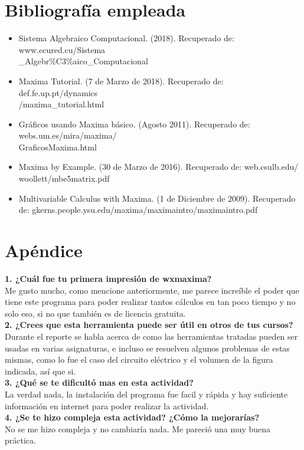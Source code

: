 \documentclass[12pt]{article}
\begin{document}
\section{Bibliografía empleada}
\begin{itemize}
    \item Sistema Algebraico Computacional. (2018). Recuperado de: www.ecured.cu/Sistema \\ \_Algebr\%C3\%aico\_Computacional
    \item Maxima Tutorial. (7 de Marzo de 2018). Recuperado de: def.fe.up.pt/dynamics \\/maxima\_tutorial.html
    \item Gráficos usando Maxima básico. (Agosto 2011). Recuperado de: webs.um.es/mira/maxima/ \\ GraficosMaxima.html
    \item Maxima by Example. (30 de Marzo de 2016). Recuperado de: web.csulb.edu/\~\\woollett/mbe5matrix.pdf
    \item Multivariable Calculus with Maxima. (1 de Diciembre de 2009). Recuperado de: gkerns.people.ysu.edu/maxima/maximaintro/maximaintro.pdf
\end{itemize}

\section{Apéndice}
\noindent\textbf {1. ¿Cuál fue tu primera impresión de wxmaxima?} \\

Me gusto mucho, como mencione anteriormente, me parece increíble el poder que tiene este programa para poder realizar tantos cálculos en tan poco tiempo y no solo eso, si no que también es de licencia gratuita. \\

\noindent\textbf {2. ¿Crees que esta herramienta puede ser útil en otros de tus cursos?} \\

Durante el reporte se habla acerca de como las herramientas tratadas pueden ser usadas en varias asignaturas, e incluso se resuelven algunos problemas de estas mismas, como lo fue el caso del circuito eléctrico y el volumen de la figura indicada, así que si. \\

\noindent\textbf {3. ¿Qué se te dificultó mas en esta actividad?} \\

La verdad nada, la instalación del programa fue facil y rápida y hay suficiente información en internet para poder realizar la actividad. \\

\noindent\textbf {4. ¿Se te hizo compleja esta actividad? ¿Cómo la mejorarías? } \\

No se me hizo compleja y no cambiaría nada. Me pareció una muy buena práctica. 
\end{document}
